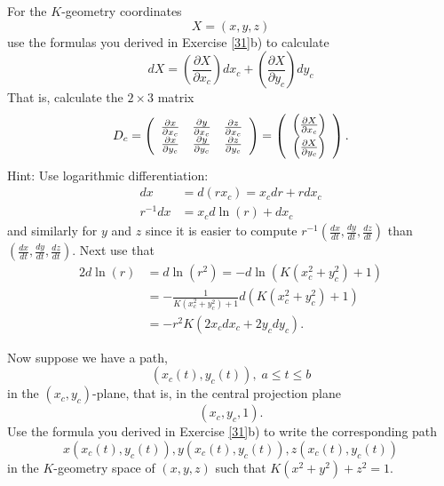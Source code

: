 \begin{exercise}
\label{33}For the $K$-geometry coordinates%
\[
X=\left(  x,y,z\right)
\]
use the formulas you derived in Exercise \ref{31}b) to calculate%
\[
dX=\left(  \frac{\partial X}{\partial x_{c}}\right)  dx_{c}+\left(
\frac{\partial X}{\partial y_{c}}\right)  dy_{c}%
\]
That is, calculate the $2\times3$ matrix%
\[
D_{c}=\left(
\begin{array}
[c]{ccc}%
\frac{\partial x}{\partial x_{c}} & \frac{\partial y}{\partial x_{c}} &
\frac{\partial z}{\partial x_{c}}\\
\frac{\partial x}{\partial y_{c}} & \frac{\partial y}{\partial y_{c}} &
\frac{\partial z}{\partial y_{c}}%
\end{array}
\right)  =\left(
\begin{array}
[c]{c}%
\left(  \frac{\partial X}{\partial x_{c}}\right) \\
\left(  \frac{\partial X}{\partial y_{c}}\right)
\end{array}
\right)  .
\]
Hint: Use logarithmic differentiation:%
\begin{align*}
dx  &  =d\left(  rx_{c}\right)  =x_{c}dr+rdx_{c}\\
r^{-1}dx  &  =x_{c}d\ln\left(  r\right)  +dx_{c}%
\end{align*}
and similarly for $y$ and $z$ since it is easier to compute $r^{-1}\left(
\frac{dx}{dt},\frac{dy}{dt},\frac{dz}{dt}\right)  $ than $\left(  \frac
{dx}{dt},\frac{dy}{dt},\frac{dz}{dt}\right)  $. Next use that%
\begin{align*}
2d\ln\left(  r\right)   &  =d\ln\left(  r^{2}\right)
=-d\ln\left(  K\left(  x_{c}^{2}+y_{c}^{2}\right)  +1\right) \\
&  =-\frac{1}{K\left(  x_{c}^{2}+y_{c}^{2}\right)  +1}d\left(  K\left(
x_{c}^{2}+y_{c}^{2}\right)  +1\right) \\
&  =-r^{2}K\left(  2x_{c}dx_{c}+2y_{c}dy_{c}\right)  .
\end{align*}

\end{exercise}

\begin{exercise}
\label{prev}Now suppose we have a path,%
\[
\left(  x_{c}\left(  t\right)  ,y_{c}\left(  t\right)  \right)  ,\;a\leq t\leq
b
\]
in the $\left(  x_{c},y_{c}\right)  $-plane, that is, in the central
projection plane%
\[
\left(  x_{c},y_{c},1\right)  .
\]
Use the formula you derived in Exercise \ref{31}b) to write the corresponding
path%
\[
x\left(  x_{c}\left(  t\right)  ,y_{c}\left(  t\right)  \right)  ,y\left(
x_{c}\left(  t\right)  ,y_{c}\left(  t\right)  \right)  ,z\left(  x_{c}\left(
t\right)  ,y_{c}\left(  t\right)  \right)
\]
in the $K$-geometry space of $\left(  x,y,z\right)  $ such that $K\left(
x^{2}+y^{2}\right)  +z^{2}=1$.
\end{exercise}

